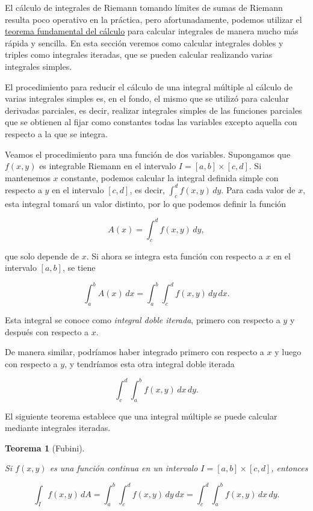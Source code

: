 \documentclass[
  a4paper,
]{scrreport}
\theoremstyle{definition}
\theoremstyle{definition}
\theoremstyle{definition}
\theoremstyle{plain}
\newtheorem{theorem}{Teorema}[chapter]
\theoremstyle{plain}
\theoremstyle{plain}
\theoremstyle{remark}
\begin{document}
El cálculo de integrales de Riemann tomando límites de sumas de Riemann
resulta poco operativo en la práctica, pero afortunadamente, podemos
utilizar el
\href{http://localhost:1313/08-integrales.html\#teorema-fundamental-del-c\%C3\%A1lculo}{teorema
fundamental del cálculo} para calcular integrales de manera mucho más
rápida y sencilla. En esta sección veremos como calcular integrales
dobles y triples como integrales iteradas, que se pueden calcular
realizando varias integrales simples.

El procedimiento para reducir el cálculo de una integral múltiple al
cálculo de varias integrales simples es, en el fondo, el mismo que se
utilizó para calcular derivadas parciales, es decir, realizar integrales
simples de las funciones parciales que se obtienen al fijar como
constantes todas las variables excepto aquella con respecto a la que se
integra.

Veamos el procedimiento para una función de dos variables. Supongamos
que \(f(x,y)\) es integrable Riemann en el intervalo
\(I=[a,b]\times [c,d]\). Si mantenemos \(x\) constante, podemos calcular
la integral definida simple con respecto a \(y\) en el intervalo
\([c,d]\), es decir, \(\int_c^d f(x,y)\, dy\). Para cada valor de \(x\),
esta integral tomará un valor distinto, por lo que podemos definir la
función

\[
A(x) = \int_c^d f(x,y)\,dy,
\]

que solo depende de \(x\). Si ahora se integra esta función con respecto
a \(x\) en el intervalo \([a,b]\), se tiene

\[
\int_a^b A(x)\,dx = \int_a^b\int_c^d f(x,y)\,dy\,dx.
\]

Esta integral se conoce como \emph{integral doble iterada}, primero con
respecto a \(y\) y después con respecto a \(x\).

De manera similar, podríamos haber integrado primero con respecto a
\(x\) y luego con respecto a \(y\), y tendríamos esta otra integral
doble iterada

\[
\int_c^d\int_a^b f(x,y)\,dx\,dy.
\]

El siguiente teorema establece que una integral múltiple se puede
calcular mediante integrales iteradas.

\begin{theorem}[Fubini]\protect\hypertarget{thm-teorema-fubini}{}\label{thm-teorema-fubini}

Si \(f(x,y)\) es una función continua en un intervalo
\(I=[a,b]\times [c,d]\), entonces

\[
\int_I f(x,y)\, dA 
= \int_a^b\int_c^d f(x,y)\,dy\,dx 
= \int_c^d\int_a^b f(x,y)\,dx\,dy.
\]

\end{theorem}
\end{document}
